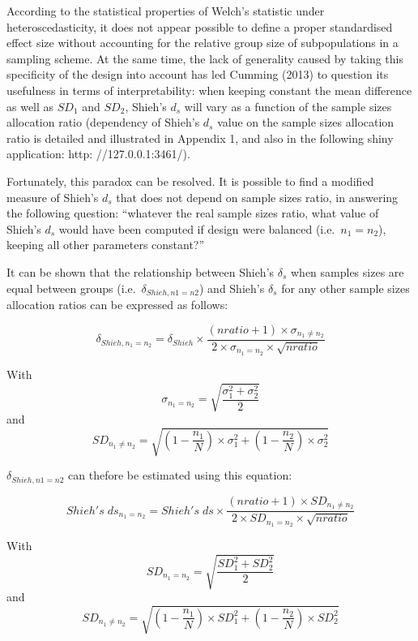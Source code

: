 \documentclass[
  man]{apa6}
\begin{document}
According to the statistical properties of Welch's statistic under heteroscedasticity, it does not appear possible to define a proper standardised effect size without accounting for the relative group size of subpopulations in a sampling scheme. At the same time, the lack of generality caused by taking this specificity of the design into account has led Cumming (2013) to question its usefulness in terms of interpretability: when keeping constant the mean difference as well as \(SD_1\) and \(SD_2\), Shieh's \(d_s\) will vary as a function of the sample sizes allocation ratio (dependency of Shieh's \(d_s\) value on the sample sizes allocation ratio is detailed and illustrated in Appendix 1, and also in the following shiny application: http: //127.0.0.1:3461/).

Fortunately, this paradox can be resolved. It is possible to find a modified measure of Shieh's \(d_s\) that does not depend on sample sizes ratio, in answering the following question: \enquote{whatever the real sample sizes ratio, what value of Shieh's \(d_s\) would have been computed if design were balanced (i.e.~\(n_1 = n_2\)), keeping all other parameters constant?}

It can be shown that the relationship between Shieh's \(\delta_s\) when samples sizes are equal between groups (i.e.~\(\delta_{Shieh, n1=n2}\)) and Shieh's \(\delta_s\) for any other sample sizes allocation ratios can be expressed as follows:

\begin{equation} 
\delta_{Shieh,n_1=n_2}= \delta_{Shieh} \times \frac{(nratio+1) \times \sigma_{n_1 \neq n_2}}{2 \times \sigma_{n_1=n_2} \times \sqrt{nratio}}
\label{eq:shiehvsbaldesignPOP}
\end{equation}

With \[\sigma_{n_1=n_2}= \sqrt{\frac{\sigma_1^2+\sigma_2^2}{2}}\] and
\[SD_{n_1 \neq n_2} = \sqrt{(1- \frac{n_1}{N}) \times \sigma_1^2+(1- \frac{n_2}{N}) \times \sigma_2^2}\]

\(\delta_{Shieh, n1=n2}\) can thefore be estimated using this equation:

\begin{equation} 
Shieh's \; ds_{n_1=n_2}= Shieh's \; ds \times \frac{(nratio+1) \times SD_{n_1 \neq n_2}}{2 \times SD_{n_1=n_2} \times \sqrt{nratio}}
\label{eq:shiehvsbaldesign}
\end{equation}

With \[SD_{n_1=n_2}= \sqrt{\frac{SD_1^2+SD_2^2}{2}}\] and
\[SD_{n_1 \neq n_2} = \sqrt{(1- \frac{n_1}{N}) \times SD_1^2+(1- \frac{n_2}{N}) \times SD_2^2}\]
\end{document}
